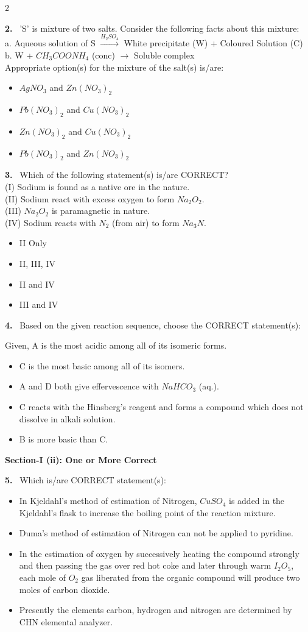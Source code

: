 \documentclass[10pt]{extarticle}
\newcommand{\sect}[1]{\par\smallskip\noindent\textbf{#1}\par}
\newcommand{\qn}[1]{\par\smallskip\noindent\textbf{#1.}~}
\newenvironment{qoptions}{\begin{itemize}[leftmargin=1.8em,itemsep=1pt,topsep=2pt,label={}]}{\end{itemize}}
\newcommand{\opt}[2]{\item[(#1)] #2}
\begin{document}
\begin{multicols}{2}
\qn{2} 'S' is mixture of two salts. Consider the following facts about this mixture:\\
a. Aqueous solution of S $\xrightarrow{H_2SO_4}$ White precipitate (W) + Coloured Solution (C)\\
b. W + $CH_3COONH_4$ (conc) $\to$ Soluble complex\\
Appropriate option(s) for the mixture of the salt(s) is/are:
\begin{qoptions}
\opt{A}{$AgNO_3$ and $Zn(NO_3)_2$}
\opt{B}{$Pb(NO_3)_2$ and $Cu(NO_3)_2$}
\opt{C}{$Zn(NO_3)_2$ and $Cu(NO_3)_2$}
\opt{D}{$Pb(NO_3)_2$ and $Zn(NO_3)_2$}
\end{qoptions}

\qn{3} Which of the following statement(s) is/are CORRECT?\\
(I) Sodium is found as a native ore in the nature.\\
(II) Sodium react with excess oxygen to form $Na_2O_2$.\\
(III) $Na_2O_2$ is paramagnetic in nature.\\
(IV) Sodium reacts with $N_2$ (from air) to form $Na_3N$.
\begin{qoptions}
\opt{A}{II Only}
\opt{B}{II, III, IV}
\opt{C}{II and IV}
\opt{D}{III and IV}
\end{qoptions}

\qn{4} Based on the given reaction sequence, choose the CORRECT statement(s):
\begin{center}\end{center}
Given, A is the most acidic among all of its isomeric forms.
\begin{qoptions}
\opt{A}{C is the most basic among all of its isomers.}
\opt{B}{A and D both give effervescence with $NaHCO_3$ (aq.).}
\opt{C}{C reacts with the Hinsberg's reagent and forms a compound which does not dissolve in alkali solution.}
\opt{D}{B is more basic than C.}
\end{qoptions}

\sect{Section-I (ii): One or More Correct}

\qn{5} Which is/are CORRECT statement(s):
\begin{qoptions}
\opt{A}{In Kjeldahl's method of estimation of Nitrogen, $CuSO_4$ is added in the Kjeldahl's flask to increase the boiling point of the reaction mixture.}
\opt{B}{Duma's method of estimation of Nitrogen can not be applied to pyridine.}
\opt{C}{In the estimation of oxygen by successively heating the compound strongly and then passing the gas over red hot coke and later through warm $I_2O_5$, each mole of $O_2$ gas liberated from the organic compound will produce two moles of carbon dioxide.}
\opt{D}{Presently the elements carbon, hydrogen and nitrogen are determined by CHN elemental analyzer.}
\end{qoptions}


\end{multicols}
\end{document}
